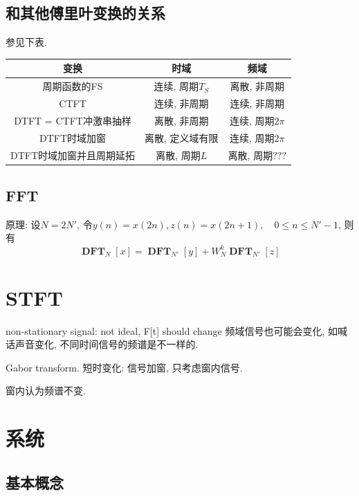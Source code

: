 \documentclass{ctexart}
\DeclareMathOperator{\CTFT}{\mathbf{CTFT}}
\DeclareMathOperator{\DFT}{\mathbf{DFT}}
\begin{document}
\subsection{和其他傅里叶变换的关系} 参见下表.
    \begin{table}[ht!]
        \centering
        \begin{tabular}{|c|c|c|}
            \hline
            变换 & 时域 & 频域\\ \hline
            周期函数的FS & 连续, 周期$T_S$ & 离散, 非周期 \\ \hline
            CTFT & 连续, 非周期 & 连续, 非周期\\ \hline
            DTFT = CTFT冲激串抽样 & 离散, 非周期 & 连续, 周期$2\pi$\\\hline
            DTFT时域加窗 & 离散, 定义域有限 & 连续, 周期$2\pi$\\\hline
            DTFT时域加窗并且周期延拓 & 离散, 周期$L$ & 离散, 周期$???$ \\ \hline
        \end{tabular}
    \end{table}

\subsection{FFT}
    原理: 设$N = 2N'$, 令$y(n) = x(2n), z(n) = x(2n+1),\quad 0 \le n \le N' - 1$, 则有\[
        \DFT_{N} [x] = \DFT_{N'} [y] + W_N^k \DFT_{N'} [z] \]

\section{STFT}
    non-stationary signal: not ideal, F[t] should change
        频域信号也可能会变化, 如喊话声音变化, 不同时间信号的频谱是不一样的.\par

    Gabor transform. 短时变化: 信号加窗, 只考虑窗内信号.\par
    窗内认为频谱不变.\par

    
\section{系统}
\subsection{基本概念}
\end{document}
